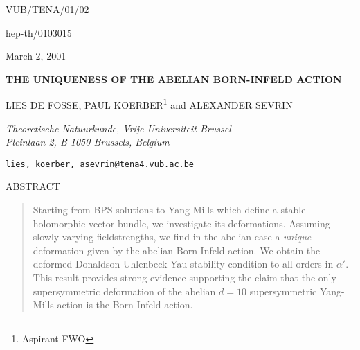 \documentclass[a4paper,12pt,oneside]{article}
\begin{document}
\thispagestyle{empty}
\setcounter{page}{0}
\renewcommand{\theequation}{\thesection.\arabic{equation}}

{\hfill{VUB/TENA/01/02}} 

{\hfill{hep-th/0103015}}

{\hfill{March 2, 2001}}

\vspace{2cm}

\begin{center}
{\bf THE UNIQUENESS OF THE ABELIAN BORN-INFELD ACTION}

\vspace{1.4cm}

LIES DE FOSSE, PAUL KOERBER\footnote{Aspirant FWO} and ALEXANDER SEVRIN

\vspace{.2cm}

{\em Theoretische Natuurkunde, Vrije Universiteit Brussel} \\
{\em Pleinlaan 2, B-1050 Brussels, Belgium} \\
\end{center}

\vspace{-.1cm}

\centerline{{\tt lies, koerber, asevrin@tena4.vub.ac.be}}
\vspace{1cm}
\centerline{ABSTRACT}

\vspace{- 4 mm}  %

\begin{quote}\small
Starting from BPS solutions to Yang-Mills which define a stable holomorphic 
vector bundle, we investigate its deformations. Assuming slowly varying 
fieldstrengths, we find in the abelian case a {\em unique} deformation given by 
the abelian Born-Infeld action. We obtain the deformed 
Donaldson-Uhlenbeck-Yau stability condition to all orders in $\alpha '$. This 
result provides strong evidence supporting the claim that the only 
supersymmetric deformation of the abelian $d=10$ supersymmetric Yang-Mills 
action is the Born-Infeld action. 
\end{quote}
\baselineskip18pt
\noindent

\vspace{5mm}

\newpage

\setcounter{equation}{0}
\end{document}
